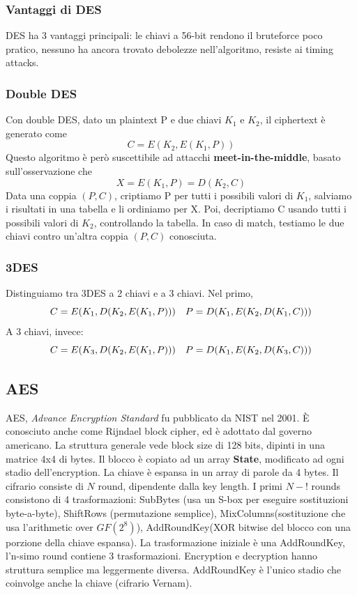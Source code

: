 \documentclass[11pt]{article}
\begin{document}
\subsubsection{Vantaggi di DES}
DES ha 3 vantaggi principali: le chiavi a 56-bit rendono il bruteforce poco pratico, nessuno ha ancora trovato debolezze nell'algoritmo, resiste ai timing attacks. 
\subsubsection{Double DES}
Con double DES, dato un plaintext P e due chiavi $K_1$ e $K_2$, il ciphertext è generato come
\begin{displaymath}
    C=E(K_2, E(K_1,P))
\end{displaymath}
Questo algoritmo è però suscettibile ad attacchi \textbf{meet-in-the-middle}, basato sull'osservazione che
\begin{displaymath}
    X=E(K_1, P) = D(K_2, C)
\end{displaymath}
Data una coppia $(P,C)$, criptiamo P per tutti i possibili valori di $K_1$, salviamo i risultati in una tabella e li ordiniamo per X. Poi, decriptiamo C usando tutti i possibili valori di $K_2$, controllando la tabella. In caso di match, testiamo le due chiavi contro un'altra coppia $(P,C)$ conosciuta. 
\subsubsection{3DES}
Distinguiamo tra 3DES a 2 chiavi e a 3 chiavi. Nel primo,
\begin{displaymath}
    C=E(K_1,D(K_2, E(K_1,P)))\hspace{10px}P=D(K_1, E(K_2, D(K_1,C)))
\end{displaymath}
A 3 chiavi, invece:
\begin{displaymath}
    C=E(K_3,D(K_2, E(K_1,P)))\hspace{10px}P=D(K_1, E(K_2, D(K_3,C)))
\end{displaymath}
\subsection{AES}
AES, \textit{Advance Encryption Standard} fu pubblicato da NIST nel 2001. È conosciuto anche come Rijndael block cipher, ed è adottato dal governo americano.
La struttura generale vede block size di 128 bits, dipinti in una matrice 4x4 di bytes. Il blocco è copiato ad un array \textbf{State}, modificato ad ogni stadio dell'encryption. La chiave è espansa in un array di parole da 4 bytes. Il cifrario consiste di $N$ round, dipendente dalla key length. I primi $N-!$ rounds consistono di 4 trasformazioni: SubBytes (usa un S-box per eseguire sostituzioni byte-a-byte), ShiftRows (permutazione semplice), MixColumns(sostituzione che usa l'arithmetic over $GF(2^8)$), AddRoundKey(XOR bitwise del blocco con una porzione della chiave espansa). La trasformazione iniziale è una AddRoundKey, l'n-simo round contiene 3 trasformazioni. Encryption e decryption hanno struttura semplice ma leggermente diversa. AddRoundKey è l'unico stadio che coinvolge anche la chiave (cifrario Vernam). 
\end{document}
